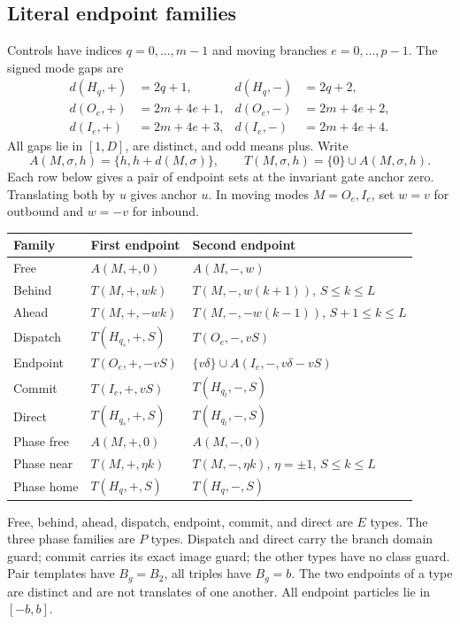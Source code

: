 \documentclass[11pt,a4paper]{article}
\numberwithin{equation}{section}
\begin{document}
\subsection{Literal endpoint families}
Controls have indices $q=0,\ldots,m-1$ and moving branches $e=0,\ldots,p-1$. The signed mode gaps are
\begin{align*}
d(H_q,+)&=2q+1,& d(H_q,-)&=2q+2,\\
d(O_e,+)&=2m+4e+1,&d(O_e,-)&=2m+4e+2,\\
d(I_e,+)&=2m+4e+3,&d(I_e,-)&=2m+4e+4.
\end{align*}
All gaps lie in $[1,D]$, are distinct, and odd means plus. Write
\[
A(M,\sigma,h)=\{h,h+d(M,\sigma)\},\qquad
T(M,\sigma,h)=\{0\}\cup A(M,\sigma,h).
\]
Each row below gives a pair of endpoint sets at the invariant gate anchor zero. Translating both by $u$ gives anchor $u$. In moving modes $M=O_e,I_e$, set $w=v$ for outbound and $w=-v$ for inbound.

\begin{longtable}{@{}p{}p{}p{}@{}}
\toprule
Family & First endpoint & Second endpoint \\ \midrule
\endhead
Free & $A(M,+,0)$ & $A(M,-,w)$ \\
Behind & $T(M,+,wk)$ & $T(M,-,w(k+1))$, $S\le k\le L$ \\
Ahead & $T(M,+,-wk)$ & $T(M,-,-w(k-1))$, $S+1\le k\le L$ \\
Dispatch & $T(H_{q_s},+,S)$ & $T(O_e,-,vS)$ \\
Endpoint & $T(O_e,+,-vS)$ & $\{v\delta\}\cup A(I_e,-,v\delta-vS)$ \\
Commit & $T(I_e,+,vS)$ & $T(H_{q_t},-,S)$ \\
Direct & $T(H_{q_s},+,S)$ & $T(H_{q_t},-,S)$ \\
Phase free & $A(M,+,0)$ & $A(M,-,0)$ \\
Phase near & $T(M,+,\eta k)$ & $T(M,-,\eta k)$, $\eta=\pm1$, $S\le k\le L$ \\
Phase home & $T(H_q,+,S)$ & $T(H_q,-,S)$ \\ \bottomrule
\end{longtable}
Free, behind, ahead, dispatch, endpoint, commit, and direct are $E$ types. The three phase families are $P$ types. Dispatch and direct carry the branch domain guard; commit carries its exact image guard; the other types have no class guard. Pair templates have $B_g=B_2$, all triples have $B_g=b$. The two endpoints of a type are distinct and are not translates of one another. All endpoint particles lie in $[-b,b]$.
\end{document}
